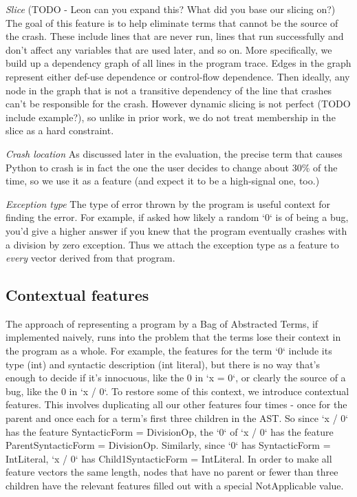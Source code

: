 \documentclass[conference]{IEEEtran}
\begin{document}
\emph{Slice} (TODO - Leon can you expand this? What did you base our slicing on?)
The goal of this feature is to help eliminate terms that cannot be the source of
the crash. These include lines that are never run, lines that run successfully
and don't affect any variables that are used later, and so on. More specifically, we
build up a dependency graph of all lines in the program trace. Edges in the graph
represent either def-use dependence or control-flow dependence. Then ideally,
any node in the graph that is not a transitive dependency of the line that crashes
can't be responsible for the crash. However dynamic slicing is not perfect (TODO
include example?), so unlike in prior work, we do not treat membership in the slice
as a hard constraint.

\emph{Crash location} As discussed later in the evaluation, the precise term that
causes Python to crash is in fact the one the user decides to change about 30\% of
the time, so we use it as a feature (and expect it to be a high-signal one, too.)

\emph{Exception type} The type of error thrown by the program is useful context for
finding the error. For example, if asked how likely a random `0` is of being a bug, you'd give
a higher answer if you knew that the program eventually crashes with a division by
zero exception. Thus we attach the exception type as a feature to \emph{every}
vector derived from that program.

\subsection{Contextual features}

The approach of representing a program by a Bag of Abstracted Terms, if implemented
naively, runs into the problem that the terms lose their context in the program
as a whole. For example, the features for the term `0` include its type (int) and
syntactic description (int literal), but there is no way that's enough to decide
if it's innocuous, like the 0 in `x = 0`, or clearly the source of a bug, like the
0 in `x / 0`. To restore some of this context, we introduce contextual features.
This involves duplicating all our other features four times - once for the parent
and once each for a term's first three children in the AST. So since `x / 0` has
the feature SyntacticForm = DivisionOp, the `0` of `x / 0` has the feature
ParentSyntacticForm = DivisionOp. Similarly, since `0` has SyntacticForm = IntLiteral,
`x / 0` has Child1SyntacticForm = IntLiteral. In order to make all feature vectors
the same length, nodes that have no parent or fewer than three children have the
relevant features filled out with a special NotApplicable value.
\end{document}
